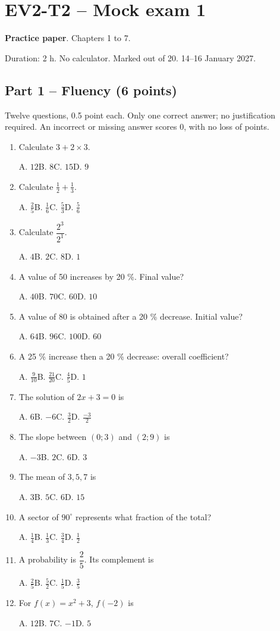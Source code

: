 \clearpage\section*{EV2-T2 -- Mock exam 1}\label{EV2-T2}
\textbf{Practice paper}. Chapters 1 to 7.\par Duration: 2 h. No calculator. Marked out of 20. 14--16 January 2027.
\subsection*{Part 1 -- Fluency (6 points)}
Twelve questions, 0.5 point each. Only one correct answer; no justification required. An incorrect or missing answer scores 0, with no loss of points.
\begin{enumerate}
\item Calculate $3+2\times3$.\par A. $12$\quad B. $8$\quad C. $15$\quad D. $9$
\item Calculate $\frac12+\frac13$.\par A. $\frac{2}{5}$\quad B. $\frac{1}{6}$\quad C. $\frac{5}{3}$\quad D. $\frac{5}{6}$
\item Calculate $\dfrac{2^3}{2^{1}}$.\par A. $4$\quad B. $2$\quad C. $8$\quad D. $1$
\item A value of 50 increases by 20 \%. Final value?\par A. $40$\quad B. $70$\quad C. $60$\quad D. $10$
\item A value of 80 is obtained after a 20 \% decrease. Initial value?\par A. $64$\quad B. $96$\quad C. $100$\quad D. $60$
\item A 25 \% increase then a 20 \% decrease: overall coefficient?\par A. $\frac{9}{10}$\quad B. $\frac{21}{20}$\quad C. $\frac{4}{5}$\quad D. $1$
\item The solution of $2x+3=0$ is\par A. $6$\quad B. $-6$\quad C. $\frac{3}{2}$\quad D. $\frac{-3}{2}$
\item The slope between $(0;3)$ and $(2;9)$ is\par A. $-3$\quad B. $2$\quad C. $6$\quad D. $3$
\item The mean of $3, 5, 7$ is\par A. $3$\quad B. $5$\quad C. $6$\quad D. $15$
\item A sector of $90^\circ$ represents what fraction of the total?\par A. $\frac{1}{4}$\quad B. $\frac{1}{3}$\quad C. $\frac{3}{4}$\quad D. $\frac{1}{2}$
\item A probability is $\dfrac{2}{5}$. Its complement is\par A. $\frac{2}{5}$\quad B. $\frac{5}{2}$\quad C. $\frac{1}{5}$\quad D. $\frac{3}{5}$
\item For $f(x)=x^2+3$, $f(-2)$ is\par A. $12$\quad B. $7$\quad C. $-1$\quad D. $5$
\end{enumerate}
